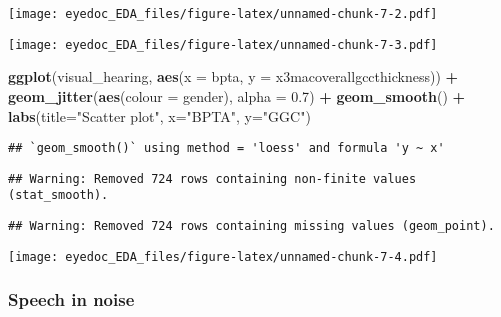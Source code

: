 \documentclass[]{article}
\newenvironment{Shaded}{\begin{snugshade}}{\end{snugshade}}
\newcommand{\DataTypeTok}[1]{\textcolor[rgb]{0.13,0.29,0.53}{#1}}
\newcommand{\FloatTok}[1]{\textcolor[rgb]{0.00,0.00,0.81}{#1}}
\newcommand{\KeywordTok}[1]{\textcolor[rgb]{0.13,0.29,0.53}{\textbf{#1}}}
\newcommand{\NormalTok}[1]{#1}
\newcommand{\OperatorTok}[1]{\textcolor[rgb]{0.81,0.36,0.00}{\textbf{#1}}}
\newcommand{\StringTok}[1]{\textcolor[rgb]{0.31,0.60,0.02}{#1}}
\begin{document}
\texttt{[image: eyedoc\_EDA\_files/figure-latex/unnamed-chunk-7-2.pdf]}

\begin{Shaded}
\end{Shaded}

\texttt{[image: eyedoc\_EDA\_files/figure-latex/unnamed-chunk-7-3.pdf]}

\begin{Shaded}
\begin{Highlighting}[]
\KeywordTok{ggplot}\NormalTok{(visual_hearing, }\KeywordTok{aes}\NormalTok{(}\DataTypeTok{x =}\NormalTok{ bpta, }\DataTypeTok{y =}\NormalTok{ x3macoverallgccthickness)) }\OperatorTok{+}
\StringTok{    }\KeywordTok{geom_jitter}\NormalTok{(}\KeywordTok{aes}\NormalTok{(}\DataTypeTok{colour =}\NormalTok{ gender), }\DataTypeTok{alpha =} \FloatTok{0.7}\NormalTok{) }\OperatorTok{+}
\StringTok{    }\KeywordTok{geom_smooth}\NormalTok{() }\OperatorTok{+}
\StringTok{    }\KeywordTok{labs}\NormalTok{(}\DataTypeTok{title=}\StringTok{"Scatter plot"}\NormalTok{, }\DataTypeTok{x=}\StringTok{"BPTA"}\NormalTok{, }\DataTypeTok{y=}\StringTok{"GGC"}\NormalTok{)}
\end{Highlighting}
\end{Shaded}

\begin{verbatim}
## `geom_smooth()` using method = 'loess' and formula 'y ~ x'
\end{verbatim}

\begin{verbatim}
## Warning: Removed 724 rows containing non-finite values (stat_smooth).
\end{verbatim}

\begin{verbatim}
## Warning: Removed 724 rows containing missing values (geom_point).
\end{verbatim}

\texttt{[image: eyedoc\_EDA\_files/figure-latex/unnamed-chunk-7-4.pdf]}

\hypertarget{speech-in-noise}{%
\subsubsection{Speech in noise}\label{speech-in-noise}}

\begin{Shaded}
\end{Shaded}
\end{document}
